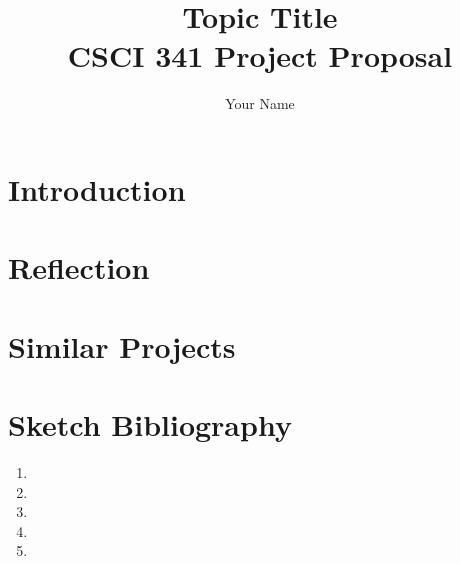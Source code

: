 \documentclass[12pt]{article}
\title{
    {\color{red} Topic Title}
    \\
    {\Large
        CSCI 341 Project Proposal
    }
}
\author{{\color{red} Your Name}}
\date{}
\theoremstyle{theorem} %
\theoremstyle{definition} %
\theoremstyle{remark} %
\renewcommand\labelenumi{(\theenumi)}
\begin{document}
\maketitle

\section{Introduction}

\section{Reflection}

\section{Similar Projects}

\section{Sketch Bibliography}
\renewcommand\labelenumi{[\theenumi]}
\begin{enumerate}
    \item 
    \item 
    \item 
    \item 
    \item 
\end{enumerate}
\end{document}
